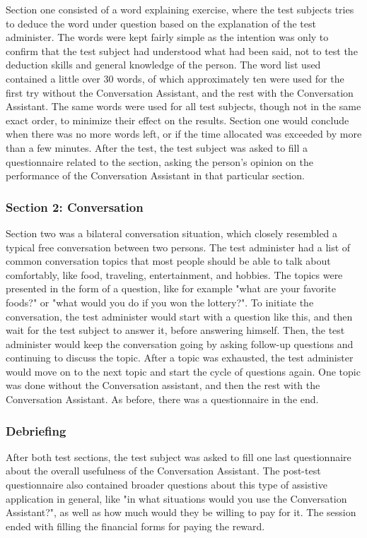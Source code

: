 \documentclass[english, 12pt, a4paper, pdftex, elec, utf8]{aaltothesis}
\begin{document}
Section one consisted of a word explaining exercise, where the test subjects tries to deduce the word under question based on the explanation of the test administer. The words were kept fairly simple as the intention was only to confirm that the test subject had understood what had been said, not to test the deduction skills and general knowledge of the person. The word list used contained a little over 30 words, of which approximately ten were used for the first try without the Conversation Assistant, and the rest with the Conversation Assistant. The same words were used for all test subjects, though not in the same exact order, to minimize their effect on the results. Section one would conclude when there was no more words left, or if the time allocated was exceeded by more than a few minutes. After the test, the test subject was asked to fill a questionnaire related to the section, asking the person's opinion on the performance of the Conversation Assistant in that particular section.

\subsubsection{Section 2: Conversation}

Section two was a bilateral conversation situation, which closely resembled a typical free conversation between two persons. The test administer had a list of common conversation topics that most people should be able to talk about comfortably, like food, traveling, entertainment, and hobbies. The topics were presented in the form of a question, like for example "what are your favorite foods?" or "what would you do if you won the lottery?". To initiate the conversation, the test administer would start with a question like this, and then wait for the test subject to answer it, before answering himself. Then, the test administer would keep the conversation going by asking follow-up questions and continuing to discuss the topic. After a topic was exhausted, the test administer would move on to the next topic and start the cycle of questions again. One topic was done without the Conversation assistant, and then the rest with the Conversation Assistant. As before, there was a questionnaire in the end.

\subsubsection{Debriefing}

After both test sections, the test subject was asked to fill one last questionnaire about the overall usefulness of the Conversation Assistant. The post-test questionnaire also contained broader questions about this type of assistive application in general, like "in what situations would you use the Conversation Assistant?", as well as how much would they be willing to pay for it. The session ended with filling the financial forms for paying the reward.
\end{document}
